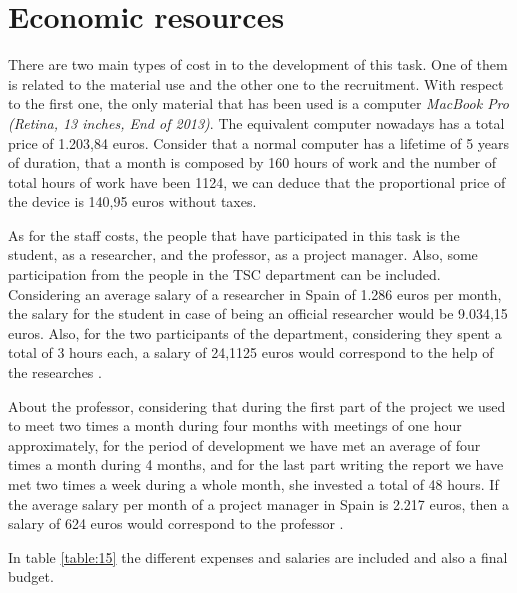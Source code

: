 \section{Economic resources}
	
	There are two main types of cost in to the development of this task. One of them is related to the material use and the other one to the recruitment. With respect to the first one, the only material that has been used is a computer \textit{MacBook Pro (Retina, 13 inches, End of 2013)}. The equivalent computer nowadays has a total price of 1.203,84 euros. Consider that a normal computer has a lifetime of 5 years of duration, that a month is composed by 160 hours of work and the number of total hours of work have been 1124, we can deduce that the proportional price of the device is 140,95 euros without taxes.
	
	As for the staff costs, the people that have participated in this task is the student, as a researcher, and the professor, as a project manager. Also, some participation from the people in the TSC department can be included. Considering an average salary of a researcher in Spain of 1.286 euros per month, the salary for the student in case of being an official researcher would be 9.034,15 euros. Also, for the two participants of the department, considering they spent a total of 3 hours each, a salary of 24,1125 euros would correspond to the help of the researches \cite{Indeed2020}. 
	
	
	About the professor, considering that during the first part of the project we used to meet two times a month during four months with meetings of one hour approximately, for the period of development we have met an average of four times a month during 4 months, and for the last part writing the report we have met two times a week during a whole month, she invested a total of 48 hours. If the average salary per month of a project manager in Spain is 2.217 euros, then a salary of 624 euros would correspond to the professor \cite{Indeed2020a}. 
	
	In table \ref{table:15} the different expenses and salaries are included and also a final budget.
	
